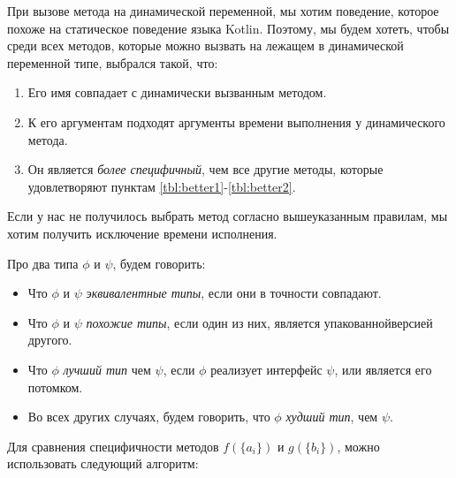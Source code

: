 При вызове метода на динамической переменной, мы хотим поведение, которое похоже на статическое поведение языка Kotlin.
Поэтому, мы будем хотеть, чтобы среди всех методов, которые можно вызвать на лежащем в динамической переменной типе, выбрался такой, что:
\begin{enumerate}
    \item Его имя совпадает с динамически вызванным методом. \label{tbl:better1}
    \item К его аргументам подходят аргументы времени выполнения у динамического метода. \label{tbl:better2}
    \item Он является \textit{более специфичный}, чем все другие методы, которые удовлетворяют пунктам \ref{tbl:better1}-\ref{tbl:better2}.
\end{enumerate}

Если у нас не получилось выбрать метод согласно вышеуказанным правилам, мы хотим получить исключение времени исполнения.

Про два типа $\phi$ и $\psi$, будем говорить:
\begin{itemize}
    \item Что $\phi$ и $\psi$ \textit{эквивалентные типы}, если они в точности совпадают.
    \item Что $\phi$ и $\psi$ \textit{похожие типы}, если один из них, является упакованной\footnotemark  версией другого.
    \item Что $\phi$ \textit{лучший тип} чем  $\psi$, если $\phi$ реализует интерфейс $\psi$, или является его потомком.
    \item Во всех других случаях, будем говорить, что $\phi$ \textit{худший тип}, чем $\psi$.
\end{itemize}


Для сравнения специфичности методов $f(\{a_i\})$ и $g(\{b_i\})$, можно использовать следующий алгоритм:

